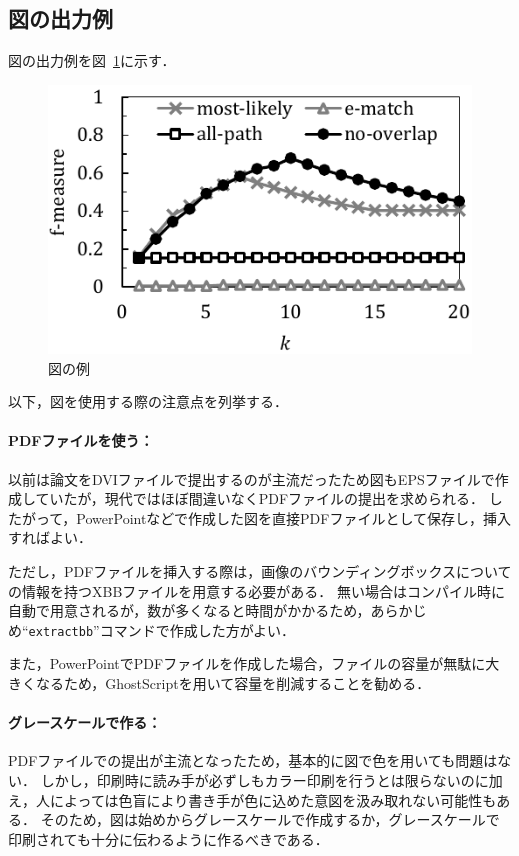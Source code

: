 \documentclass[lualatex]{ipsj}
\newcommand{\Fig}[1]{図~#1}
\begin{document}
  \subsection{図の出力例}
  図の出力例を\Fig{\ref{fig:sample}}に示す．
  
    \begin{figure}[t]
    \centering
    \includegraphics[width=60truemm]{./figures/sample_graph.pdf}
    \caption{図の例}
    \label{fig:sample}
    \end{figure}
  
  以下，図を使用する際の注意点を列挙する．
  
    \paragraph{PDFファイルを使う：}
    以前は論文をDVIファイルで提出するのが主流だったため図もEPSファイルで作成していたが，現代ではほぼ間違いなくPDFファイルの提出を求められる．
    したがって，PowerPointなどで作成した図を直接PDFファイルとして保存し，挿入すればよい．
    
    ただし，PDFファイルを挿入する際は，画像のバウンディングボックスについての情報を持つXBBファイルを用意する必要がある．
    無い場合はコンパイル時に自動で用意されるが，数が多くなると時間がかかるため，あらかじめ``\texttt{extractbb}''コマンドで作成した方がよい．

    また，PowerPointでPDFファイルを作成した場合，ファイルの容量が無駄に大きくなるため，GhostScriptを用いて容量を削減することを勧める．
    
    \paragraph{グレースケールで作る：}
    PDFファイルでの提出が主流となったため，基本的に図で色を用いても問題はない．
    しかし，印刷時に読み手が必ずしもカラー印刷を行うとは限らないのに加え，人によっては色盲により書き手が色に込めた意図を汲み取れない可能性もある．
    そのため，図は始めからグレースケールで作成するか，グレースケールで印刷されても十分に伝わるように作るべきである．
    
\end{document}
